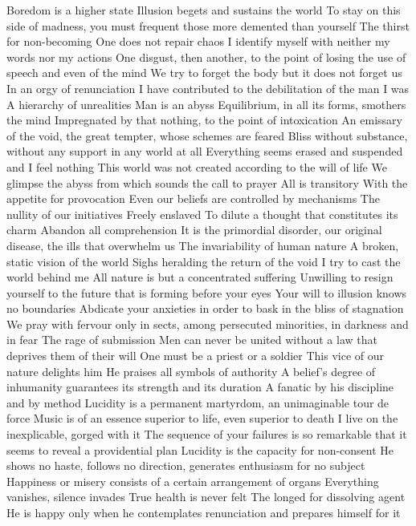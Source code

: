 \documentclass{article}
\begin{document}
Boredom is a higher state
Illusion begets and sustains the world
To stay on this side of madness, you must frequent those more demented than yourself
The thirst for non-becoming
One does not repair chaos
I identify myself with neither my words nor my actions
One disgust, then another, to the point of losing the use of speech and even of the mind
We try to forget the body but it does not forget us
In an orgy of renunciation
I have contributed to the debilitation of the man I was
A hierarchy of unrealities
Man is an abyss
Equilibrium, in all its forms, smothers the mind
Impregnated by that nothing, to the point of intoxication
An emissary of the void, the great tempter, whose schemes are feared
Bliss without substance, without any support in any world at all
Everything seems erased and suspended and I feel nothing
This world was not created according to the will of life
We glimpse the abyss from which sounds the call to prayer
All is transitory
With the appetite for provocation
Even our beliefs are controlled by mechanisms
The nullity of our initiatives
Freely enslaved
To dilute a thought that constitutes its charm
Abandon all comprehension
It is the primordial disorder, our original disease, the ills that overwhelm us
The invariability of human nature
A broken, static vision of the world
Sighs heralding the return of the void
I try to cast the world behind me
All nature is but a concentrated suffering
Unwilling to resign yourself to the future that is forming before your eyes
Your will to illusion knows no boundaries
Abdicate your anxieties in order to bask in the bliss of stagnation
We pray with fervour only in sects, among persecuted minorities, in darkness and in fear
The rage of submission
Men can never be united without a law that deprives them of their will
One must be a priest or a soldier
This vice of our nature delights him
He praises all symbols of authority
A belief's degree of inhumanity guarantees its strength and its duration
A fanatic by his discipline and by method
Lucidity is a permanent martyrdom, an unimaginable tour de force
Music is of an essence superior to life, even superior to death
I live on the inexplicable, gorged with it
The sequence of your failures is so remarkable that it seems to reveal a providential plan
Lucidity is the capacity for non-consent
He shows no haste, follows no direction, generates enthusiasm for no subject
Happiness or misery consists of a certain arrangement of organs
Everything vanishes, silence invades
True health is never felt
The longed for dissolving agent
He is happy only when he contemplates renunciation and prepares himself for it
\end{document}
